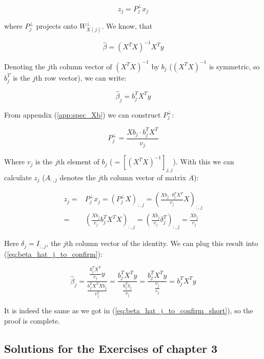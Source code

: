 \documentclass{article}
\begin{document}
\begin{equation}
    z_j = P^{\perp}_j x_j
\end{equation}

where $P^{\perp}_j$ projects onto $W^{\perp}_{X(j)}$. We know, that

\begin{equation}
    \hat{\beta} = (X^TX)^{-1} X^T y
\end{equation}

Denoting the $j$th column vector of $(X^TX)^{-1}$ by $b_j$ ($(X^TX)^{-1}$ is symmetric, so $b^T_j$ is the $j$th row vector), we can write:

\begin{equation} \label{eq:beta_hat_j_to_confirm_short}
    \hat{\beta}_j = b^T_j X^T y
\end{equation}

From appendix (\ref{app:spec_Xb}) we can construct $P^{\perp}_j$:

\begin{equation}
    P^{\perp}_j = \frac{X b_j \cdot b^T_j X^T}{v_j}
\end{equation}

Where $v_j$ is the $j$th element of $b_j$ ($= [(X^TX)^{-1}]_{j,j}$). With this we can calculate $z_j$ ($A_{:,j}$ denotes the $j$th column vector of matrix $A$):

\begin{equation}
    \begin{split}
        z_j =& P^{\perp}_j x_j = (P^{\perp}_j X)_{:,j} = \left(\frac{X b_j \cdot b^T_j X^T}{v_j} X\right)_{:,j}\\
        =&  \left(\frac{X b_j}{v_j} b^T_j X^TX\right)_{:,j} = \left(\frac{X b_j}{v_j} \delta^T_j\right)_{:,j} = \frac{X b_j}{v_j}
    \end{split}
\end{equation}

Here $\delta_j = I_{:,j}$, the $j$th column vector of the identity. We can plug this result into (\ref{eq:beta_hat_j_to_confirm}):

\begin{equation}
    \hat{\beta}_j = \frac{\frac{b^T_j X^T}{v_j} y}{\frac{b^T_j X^T X b_j}{v^2_j}} = \frac{b^T_j X^T y}{\frac{b^T_j \delta_j}{v_j}} = \frac{b^T_j X^T y}{\frac{v_j}{v_j}} = b^T_j X^T y
\end{equation}

It is indeed the same as we got in (\ref{eq:beta_hat_j_to_confirm_short}), so the proof is complete.

\subsection{Solutions for the Exercises of chapter 3}
\end{document}
